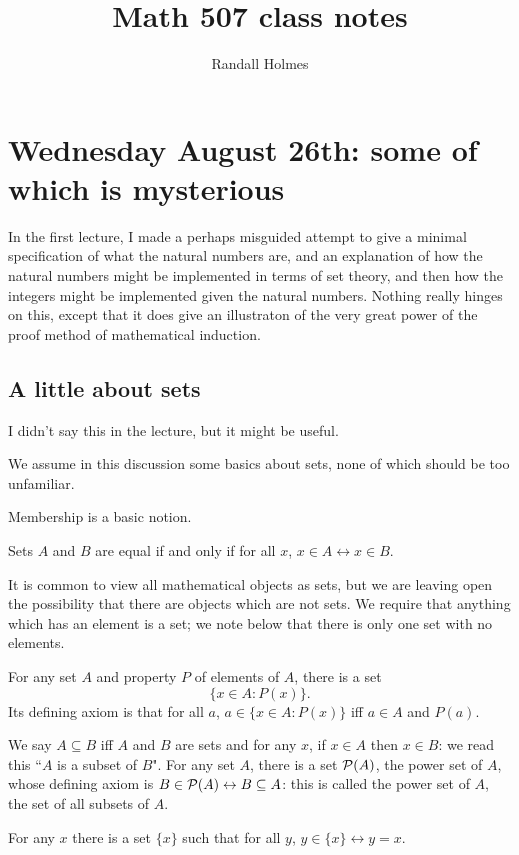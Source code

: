 \documentclass[12pt]{article}
\title{Math 507 class notes}
\author{Randall Holmes}
\begin{document}
\maketitle

\tableofcontents

\section{Wednesday August 26th:  some of which is mysterious}


In the first lecture, I made a perhaps misguided attempt to give a minimal specification of what the natural numbers are, and an explanation of how the natural numbers might be implemented in terms of set theory, and then how the integers might be implemented given the natural numbers.  Nothing really hinges on this, except that it does give an illustraton of the very great power of the proof method of mathematical induction.

\subsection{A little about sets}

I didn't say this in the lecture, but it might be useful.

We assume in this discussion some basics about sets, none of which should be too unfamiliar.  

Membership is a basic notion.  

Sets $A$ and $B$ are equal if and only if for all $x$, $x \in A \leftrightarrow x \in B$. 

It is common to view all mathematical objects as sets, but we are leaving open the possibility that there are objects which are not sets.  We require that anything which has an element is a set;  we note below that there is only one set with no elements.

For any set $A$ and property $P$ of elements of $A$, there is a set $$\{x \in A:P(x)\}.$$  Its defining axiom is that for all $a$, $a \in \{x \in A:P(x)\}$ iff $a \in A$ and $P(a)$.

We say $A \subseteq B$ iff $A$ and $B$ are sets and for any $x$, if $x \in A$ then $x \in B$:  we read this ``$A$ is a subset of $B$".  For any set $A$, there is a set ${\cal P}(A)$, the power set of $A$,
whose defining axiom is $B \in {\cal P}(A) \leftrightarrow B \subseteq A$:  this is called the power set of $A$, the set of all subsets of $A$.

  For any $x$ there is a set $\{x\}$ such that for all $y$, $y \in \{x\} \leftrightarrow y = x$.   
\end{document}
